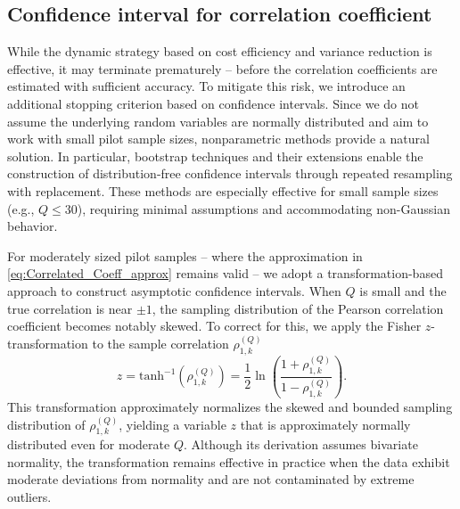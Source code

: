 \subsection{Confidence interval for correlation coefficient}
While the dynamic strategy based on cost efficiency and variance reduction is effective, it may terminate prematurely -- before the correlation coefficients are estimated with sufficient accuracy. To mitigate this risk, we introduce an additional stopping criterion based on confidence intervals. Since we do not assume the underlying random variables are normally distributed and aim to work with small pilot sample sizes, nonparametric methods provide a natural solution. In particular, bootstrap techniques \cite{Ef:1979, EfTi:1993} and their extensions \cite{BeDeToMeBaRo:2007} enable the construction of distribution-free confidence intervals through repeated resampling with replacement. These methods are especially effective for small sample sizes (e.g., $Q \leq 30$), requiring minimal assumptions and accommodating non-Gaussian behavior.

For moderately sized pilot samples -- where the approximation in \eqref{eq:Correlated_Coeff_approx} remains valid -- we adopt a transformation-based approach to construct asymptotic confidence intervals. When $Q$ is small and the true correlation is near $\pm 1$, the sampling distribution of the Pearson correlation coefficient becomes notably skewed. To correct for this, we apply the Fisher $z$-transformation \cite{Fi:1915, Fi:1921} to the sample correlation $\rho_{1,k}^{(Q)}$
%
\begin{equation}
\label{eq:z_prime}
    z  = \text{tanh}^{-1}\left(\rho_{1,k}^{(Q)}\right) = \frac 1 2\ln \left(\frac{1+\rho_{1,k}^{(Q)}}{1-\rho_{1,k}^{(Q)}}\right).
\end{equation}
%
This transformation approximately normalizes the skewed and bounded sampling distribution of $\rho_{1,k}^{(Q)}$, yielding a variable $z$ that is approximately normally distributed even for moderate $Q$. Although its derivation assumes bivariate normality, the transformation remains effective in practice when the data exhibit moderate deviations from normality and are not contaminated by extreme outliers. 


